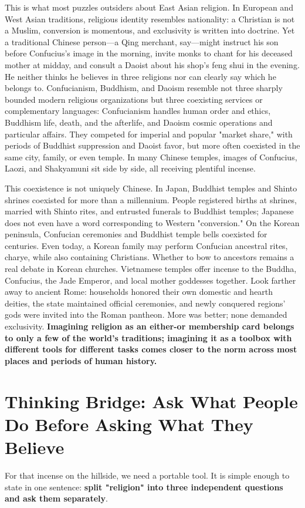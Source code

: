 This is what most puzzles outsiders about East Asian religion. In European and West Asian traditions, religious identity resembles nationality: a Christian is not a Muslim, conversion is momentous, and exclusivity is written into doctrine. Yet a traditional Chinese person---a Qing merchant, say---might instruct his son before Confucius's image in the morning, invite monks to chant for his deceased mother at midday, and consult a Daoist about his shop's feng shui in the evening. He neither thinks he believes in three religions nor can clearly say which he belongs to. Confucianism, Buddhism, and Daoism resemble not three sharply bounded modern religious organizations but three coexisting services or complementary languages: Confucianism handles human order and ethics, Buddhism life, death, and the afterlife, and Daoism cosmic operations and particular affairs. They competed for imperial and popular "market share," with periods of Buddhist suppression and Daoist favor, but more often coexisted in the same city, family, or even temple. In many Chinese temples, images of Confucius, Laozi, and Shakyamuni sit side by side, all receiving plentiful incense.

This coexistence is not uniquely Chinese. In Japan, Buddhist temples and Shinto shrines coexisted for more than a millennium. People registered births at shrines, married with Shinto rites, and entrusted funerals to Buddhist temples; Japanese does not even have a word corresponding to Western "conversion." On the Korean peninsula, Confucian ceremonies and Buddhist temple bells coexisted for centuries. Even today, a Korean family may perform Confucian ancestral rites, charye, while also containing Christians. Whether to bow to ancestors remains a real debate in Korean churches. Vietnamese temples offer incense to the Buddha, Confucius, the Jade Emperor, and local mother goddesses together. Look farther away to ancient Rome: households honored their own domestic and hearth deities, the state maintained official ceremonies, and newly conquered regions' gods were invited into the Roman pantheon. More was better; none demanded exclusivity. \textbf{Imagining religion as an either-or membership card belongs to only a few of the world's traditions; imagining it as a toolbox with different tools for different tasks comes closer to the norm across most places and periods of human history.}

\section[Thinking Bridge: Practice Before Belief]{Thinking Bridge: Ask What People Do Before Asking What They Believe}
For that incense on the hillside, we need a portable tool. It is simple enough to state in one sentence: \textbf{split "religion" into three independent questions and ask them separately}.

